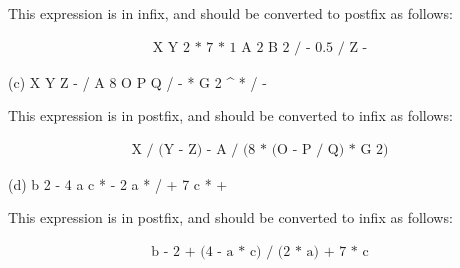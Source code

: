 \documentclass[12pt]{article}
\begin{document}
\noindent This expression is in infix, and should be converted to postfix as follows:

\begin{align*}
	\boxed{\text{X Y 2 \^{} * 7 * 1 A 2 \^{} B 2 \^{} / - 0.5 \^{} / Z -}}
\end{align*}

\noindent \hdashrule[0.5ex]{\textwidth}{1pt}{3mm 2mm}

\noindent (c) X Y Z - / A 8 O P Q / - * G 2 \^{} * / -

\noindent This expression is in postfix, and should be converted to infix as follows:

\begin{align*}
	\boxed{\text{X / (Y - Z) - A / (8 * (O - P / Q) * G \^{} 2)}}
\end{align*}

\noindent \hdashrule[0.5ex]{\textwidth}{1pt}{3mm 2mm}

\noindent (d) b 2 - 4 a c * - 2 a * / + 7 c * +

\noindent This expression is in postfix, and should be converted to infix as follows:

\begin{align*}
	\boxed{\text{b - 2 + (4 - a * c) / (2 * a) + 7 * c}}
\end{align*}
\end{document}
